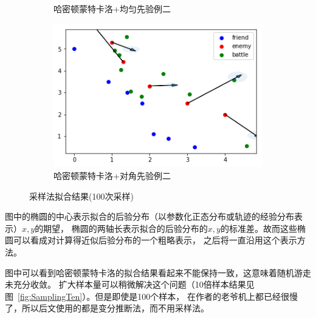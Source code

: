 \documentclass{sicnuthesis}
\begin{document}
\begin{figure}[htb]
\begin{subfigure}[b]{0.45\linewidth}
    \caption{哈密顿蒙特卡洛+均匀先验例二}
  \end{subfigure}
  \begin{subfigure}[b]{0.45\linewidth}
    \includegraphics[width=\linewidth]{Sampling22.png}
    \caption{哈密顿蒙特卡洛+对角先验例二}
  \end{subfigure}
  \caption{采样法拟合结果(100次采样)}
  \label{fig:samping}
\end{figure}

图中的椭圆的中心表示拟合的后验分布（以参数化正态分布或轨迹的经验分布表示）$x,y$的期望，
椭圆的两轴长表示拟合的后验分布的$x,y$的标准差。故而这些椭圆可以看成对计算得近似后验分布的一个粗略表示，
之后将一直沿用这个表示方法。

图中可以看到哈密顿蒙特卡洛的拟合结果看起来不能保持一致，这意味着随机游走未充分收敛。
扩大样本量可以稍微解决这个问题（10倍样本结果见图~\ref{fig:SamplingTen}）。但是即使是100个样本，
在作者的老爷机上都已经很慢了，所以后文使用的都是变分推断法，而不用采样法。
\end{document}
